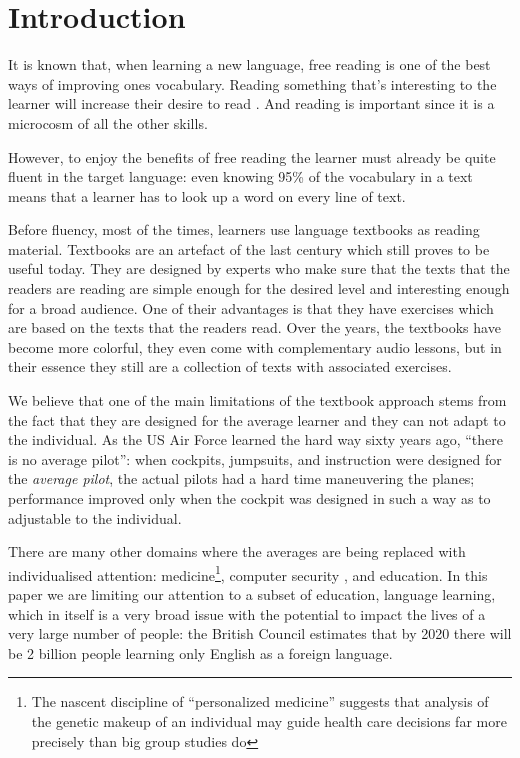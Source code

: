 
\newpage
\section{Introduction}

It is known that, when learning a new language, free reading is one of the best ways of improving ones vocabulary. Reading something that's interesting to the learner will increase their desire to read . And reading is important since it is a microcosm of all the other skills. \cite{mccarthy1999-microcosm} 

However, to enjoy the benefits of free reading the learner must already be quite fluent in the target language: even knowing 95\% of the vocabulary in a text means that a learner has to look up a word on every line of text. \cite{Hirsh92-vocab-size}

Before fluency, most of the times, learners use language textbooks as reading material. Textbooks are an artefact of the last century which still proves to be useful today. They are designed by experts who make sure that the texts that the readers are reading are simple enough for the desired level and interesting enough for a broad audience. One of their advantages is that they have exercises which are based on the texts that the readers read. Over the years, the textbooks have become more colorful, they even come with complementary audio lessons, but in their essence they still are a collection of texts with associated exercises.

We believe that one of the main limitations of the textbook approach stems from the fact that they are designed for the average learner and they can not adapt to the individual. As the US Air Force learned the hard way sixty years ago, ``there is no average pilot'': when cockpits, jumpsuits, and instruction were designed for the {\em average pilot}, the actual pilots had a hard time maneuvering the planes; performance improved only when the cockpit was designed in such a way as to adjustable to the individual. 

There are many other domains where the averages are being replaced with individualised attention: medicine\footnote{The nascent discipline of ``personalized medicine'' suggests that analysis of the genetic makeup of an individual may guide health care decisions far more precisely than big group studies do}, computer security , and education. In this paper we are limiting our attention to a subset of education, language learning, which in itself is a very broad issue with the potential to impact the lives of a very large number of people: the British Council estimates that by 2020 there will be 2 billion people learning only English as a foreign language. 

